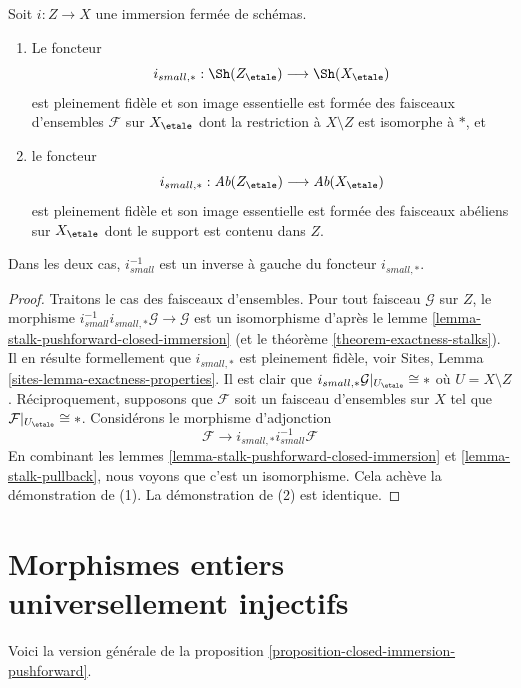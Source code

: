 \begin{proposition}
\label{proposition-closed-immersion-pushforward}
Soit $i : Z \to X$ une immersion ferm\'ee de sch\'emas.
\begin{enumerate}
\item Le foncteur
$$
i_{small, *} :
\Sh(Z_\etale)
\longrightarrow
\Sh(X_\etale)
$$
est pleinement fid\`ele et son image essentielle est form\'ee des faisceaux d'ensembles
$\mathcal{F}$ sur $X_\etale$ dont la restriction \`a $X \setminus Z$ est
isomorphe \`a $*$, et
\item le foncteur
$$
i_{small, *} :
\textit{Ab}(Z_\etale)
\longrightarrow
\textit{Ab}(X_\etale)
$$
est pleinement fid\`ele et son image essentielle est form\'ee des faisceaux ab\'eliens sur
$X_\etale$ dont le support est contenu dans $Z$.
\end{enumerate}
Dans les deux cas, $i_{small}^{-1}$ est un inverse \`a gauche du foncteur
$i_{small, *}$.
\end{proposition}

\begin{proof}
Traitons le cas des faisceaux d'ensembles.
Pour tout faisceau $\mathcal{G}$ sur $Z$, le morphisme
$i_{small}^{-1}i_{small, *}\mathcal{G} \to \mathcal{G}$
est un isomorphisme d'apr\`es
le lemme \ref{lemma-stalk-pushforward-closed-immersion}
(et
le th\'eor\`eme \ref{theorem-exactness-stalks}).
Il en r\'esulte formellement que $i_{small, *}$ est pleinement fid\`ele, voir
Sites, Lemma \ref{sites-lemma-exactness-properties}.
Il est clair que $i_{small, *}\mathcal{G}|_{U_\etale} \cong *$
o\`u $U = X \setminus Z$. R\'eciproquement, supposons que $\mathcal{F}$
soit un faisceau d'ensembles sur $X$ tel que $\mathcal{F}|_{U_\etale} \cong *$.
Consid\'erons le morphisme d'adjonction
$$
\mathcal{F} \longrightarrow i_{small, *}i_{small}^{-1}\mathcal{F}
$$
En combinant
les lemmes \ref{lemma-stalk-pushforward-closed-immersion} et
\ref{lemma-stalk-pullback},
nous voyons que c'est un isomorphisme. Cela ach\`eve la d\'emonstration de (1).
La d\'emonstration de (2) est identique.
\end{proof}





\section{Morphismes entiers universellement injectifs}
\label{section-integral-universally-injective}

\noindent
Voici la version g\'en\'erale de la
proposition \ref{proposition-closed-immersion-pushforward}.

